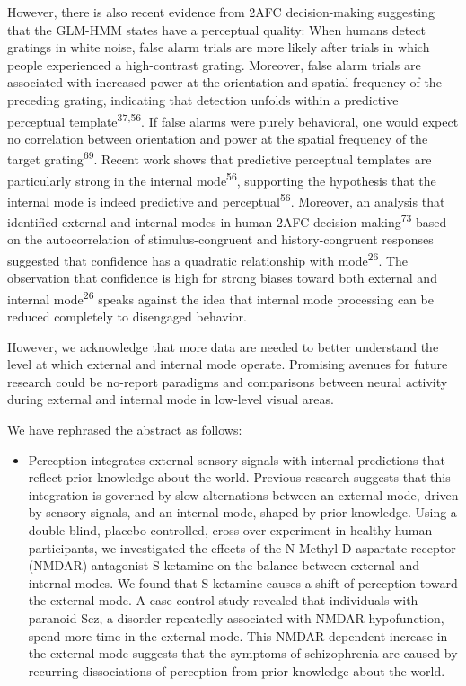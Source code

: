 \documentclass[
]{article}
\providecommand{\tightlist}{%
  \setlength{\itemsep}{0pt}\setlength{\parskip}{0pt}}
\begin{document}
However, there is also recent evidence from 2AFC decision-making
suggesting that the GLM-HMM states have a perceptual quality: When
humans detect gratings in white noise, false alarm trials are more
likely after trials in which people experienced a high-contrast grating.
Moreover, false alarm trials are associated with increased power at the
orientation and spatial frequency of the preceding grating, indicating
that detection unfolds within a predictive perceptual
template\textsuperscript{37,56}. If false alarms were purely behavioral,
one would expect no correlation between orientation and power at the
spatial frequency of the target grating\textsuperscript{69}. Recent work
shows that predictive perceptual templates are particularly strong in
the internal mode\textsuperscript{56}, supporting the hypothesis that
the internal mode is indeed predictive and
perceptual\textsuperscript{56}. Moreover, an analysis that identified
external and internal modes in human 2AFC
decision-making\textsuperscript{73} based on the autocorrelation of
stimulus-congruent and history-congruent responses suggested that
confidence has a quadratic relationship with mode\textsuperscript{26}.
The observation that confidence is high for strong biases toward both
external and internal mode\textsuperscript{26} speaks against the idea
that internal mode processing can be reduced completely to disengaged
behavior.

However, we acknowledge that more data are needed to better understand
the level at which external and internal mode operate. Promising avenues
for future research could be no-report paradigms and comparisons between
neural activity during external and internal mode in low-level visual
areas.

We have rephrased the abstract as follows:

\begin{itemize}
\tightlist
\item
  Perception integrates external sensory signals with internal
  predictions that reflect prior knowledge about the world. Previous
  research suggests that this integration is governed by slow
  alternations between an external mode, driven by sensory signals, and
  an internal mode, shaped by prior knowledge. Using a double-blind,
  placebo-controlled, cross-over experiment in healthy human
  participants, we investigated the effects of the N-Methyl-D-aspartate
  receptor (NMDAR) antagonist S-ketamine on the balance between external
  and internal modes. We found that S-ketamine causes a shift of
  perception toward the external mode. A case-control study revealed
  that individuals with paranoid Scz, a disorder repeatedly associated
  with NMDAR hypofunction, spend more time in the external mode. This
  NMDAR-dependent increase in the external mode suggests that the
  symptoms of schizophrenia are caused by recurring dissociations of
  perception from prior knowledge about the world.
\end{itemize}
\end{document}
